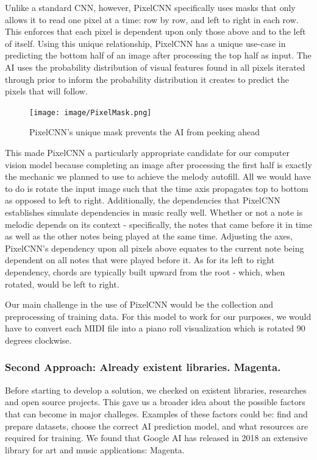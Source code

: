 Unlike a standard CNN, however, PixelCNN specifically uses masks that only allows it to read
one pixel at a time: row by row, and left to right in each row.\autocite{pixelCNN} This enforces that each pixel
is dependent upon only those above and to the left of itself. Using this unique relationship,
PixelCNN has a unique use-case in predicting the bottom half of an image after processing the
top half as input. The AI uses the probability distribution of visual features found in all pixels
iterated through prior to inform the probability distribution it creates to predict the pixels that
will follow.\autocite{pixelRNN}

\begin{figure}[h!]
  \centering
  \texttt{[image: image/PixelMask.png]}
  \caption{PixelCNN's unique mask prevents the AI from peeking ahead}
  \label{fig:pixel_mask}
\end{figure}

This made PixelCNN a particularly appropriate candidate for our computer vision model
because completing an image after processing the first half is exactly the mechanic we
planned to use to achieve the melody autofill. All we would have to do is rotate the input
image such that the time axis propagates top to bottom as opposed to left to right.
Additionally, the dependencies that PixelCNN establishes simulate dependencies in music
really well. Whether or not a note is melodic depends on its context - specifically, the
notes that came before it in time as well as the other notes being played at the same
time. Adjusting the axes, PixelCNN's dependency upon all pixels above equates to the
current note being dependent on all notes that were played before it. As for its left to
right dependency, chords are typically built upward from the root - which, when rotated,
would be left to right.

Our main challenge in the use of PixelCNN would be the collection and preprocessing of
training data. For this model to work for our purposes, we would have to convert each MIDI
file into a piano roll visualization which is rotated 90 degrees clockwise.

\subsubsection{Second Approach: Already existent libraries. Magenta.}

Before starting to develop a solution, we checked on existent libraries, researches and
open source projects. This gave us a broader idea about the possible factors that can
become in major challeges. Examples of these factors could be: find and prepare datasets,
choose the correct AI prediction model, and what resources are required for training. We
found that Google AI has released in 2018 an extensive library for art and music
applications: Magenta.

